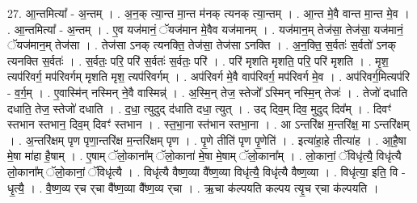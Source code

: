 \documentclass[17pt]{extarticle}
\begin{document}
27. आ॒न्तमित्या᳚ - अ॒न्तम् । . अ॒न॒क् त्या॒न्त मा॒न्त म॑नक् त्यनक् त्या॒न्तम् । . आ॒न्त मे॒वै वान्त मा॒न्त मे॒व । . आ॒न्तमित्या᳚ - अ॒न्तम् । . ए॒व यज॑मानं॒ ॅयज॑मान मे॒वैव यज॑मानम् । . यज॑मान॒म् तेज॑सा॒ तेज॑सा॒ यज॑मानं॒ ॅयज॑मान॒म् तेज॑सा । . तेज॑सा ऽनक् त्यनक्ति॒ तेज॑सा॒ तेज॑सा ऽनक्ति । . अ॒न॒क्ति॒ स॒र्वतः॑ स॒र्वतो॑ ऽनक् त्यनक्ति स॒र्वतः॑ । . स॒र्वतः॒ परि॒ परि॑ स॒र्वतः॑ स॒र्वतः॒ परि॑ । . परि॑ मृशति मृशति॒ परि॒ परि॑ मृशति । . मृ॒श॒ त्यप॑रिवर्ग॒ मप॑रिवर्गम् मृशति मृश॒ त्यप॑रिवर्गम् । . अप॑रिवर्ग मे॒वै वाप॑रिवर्ग॒ मप॑रिवर्ग मे॒व । . अप॑रिवर्ग॒मित्यप॑रि - व॒र्ग॒म् । . ए॒वास्मि॑न् नस्मिन् ने॒वै वास्मिन्न्॑ । . अ॒स्मि॒न् तेज॒ स्तेजो᳚ ऽस्मिन् नस्मि॒न् तेजः॑ । . तेजो॑ दधाति दधाति॒ तेज॒ स्तेजो॑ दधाति । . द॒धा॒ त्युदुद् द॑धाति दधा॒ त्युत् । . उद् दिव॒म् दिव॒ मुदुद् दिव᳚म् । . दिवꣳ॑ स्तभान स्तभान॒ दिव॒म् दिवꣳ॑ स्तभान । . स्त॒भा॒ना स्त॑भान स्तभा॒ना । . आ ऽन्तरि॑क्ष म॒न्तरि॑क्ष॒ मा ऽन्तरि॑क्षम् । . अ॒न्तरि॑क्षम् पृण पृणा॒न्तरि॑क्ष म॒न्तरि॑क्षम् पृण । . पृ॒णे तीति॑ पृण पृ॒णेति॑ । . इत्या॑हा॒हे तीत्या॑ह । . आ॒है॒षा मे॒षा मा॑हा है॒षाम् । . ए॒षाम् ॅलो॒काना᳚म् ॅलो॒काना॑ मे॒षा मे॒षाम् ॅलो॒काना᳚म् । . लो॒कानां॒ ॅविधृ॑त्यै॒ विधृ॑त्यै लो॒काना᳚म् ॅलो॒कानां॒ ॅविधृ॑त्यै । . विधृ॑त्यै वैष्ण॒व्या वै᳚ष्ण॒व्या विधृ॑त्यै॒ विधृ॑त्यै वैष्ण॒व्या । . विधृ॑त्या॒ इति॒ वि - धृ॒त्यै॒ । . वै॒ष्ण॒व्य र्‌च र्‌चा वै᳚ष्ण॒व्या वै᳚ष्ण॒व्य र्‌चा । . ऋ॒चा क॑ल्पयति कल्पय त्यृ॒च र्‌चा क॑ल्पयति । \newline
\end{document}

